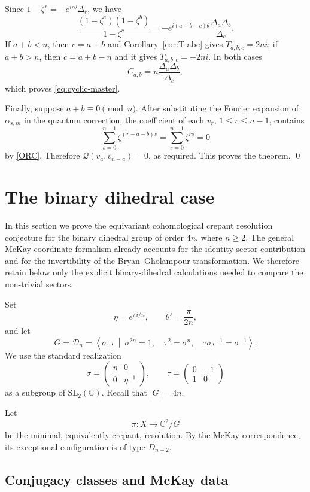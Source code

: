 \documentclass[a4paper,reqno]{amsart}
\theoremstyle{plain} %
\theoremstyle{definition} %
\theoremstyle{remark} %
\newcommand{\z}{\zeta}
\newcommand{\cD}{{\mathcal D}}
\newcommand{\1}{\mathds{1}}   %
\begin{document}
Since $1-\z^r=-e^{ir\theta}\Delta_r$, we have
\[
\frac{(1-\z^a)(1-\z^b)}{1-\z^c}
=-e^{i(a+b-c)\theta}\frac{\Delta_a\Delta_b}{\Delta_c}.
\]
If $a+b<n$, then $c=a+b$ and Corollary~\ref{cor:T-abc} gives
$T_{a,b,c}=2ni$; if $a+b>n$, then $c=a+b-n$ and it gives
$T_{a,b,c}=-2ni$.  In both cases
\[
C_{a,b}=n\frac{\Delta_a\Delta_b}{\Delta_c},
\]
which proves \eqref{eq:cyclic-master}.

Finally, suppose $a+b\equiv0\pmod n$.  After substituting the Fourier
expansion of $\alpha_{s,m}$ in the quantum correction, the coefficient of
each $v_r$, $1\leq r\leq n-1$, contains
\[
\sum_{s=0}^{n-1}\z^{(r-a-b)s}
=
\sum_{s=0}^{n-1}\z^{rs}=0
\]
by \eqref{ORC}.  Therefore $\mathcal Q(v_a,v_{n-a})=0$, as required. This proves the theorem.
\qed


\section{The binary dihedral case}\label{sec:binary-dihedral}

In this section we prove the equivariant cohomological crepant
resolution conjecture for the binary dihedral group of order \(4n\),
where \(n\ge2\). The general McKay-coordinate formalism already
accounts for the identity-sector contribution and for the invertibility of the
Bryan--Gholampour transformation.  We therefore retain below only the explicit
binary-dihedral calculations needed to compare the non-trivial sectors.

Set
\[
\eta=e^{\pi i/n},
\qquad
\theta'=\frac{\pi}{2n},
\]
and let
\[
G=\cD_n
=
\left\langle
\sigma,\tau
\ \middle|\
\sigma^{2n}=1,\quad
\tau^2=\sigma^n,\quad
\tau\sigma\tau^{-1}=\sigma^{-1}
\right\rangle .
\]
We use the standard realization
\[
\sigma=
\begin{pmatrix}
\eta&0\\
0&\eta^{-1}
\end{pmatrix},
\qquad
\tau=
\begin{pmatrix}
0&-1\\
1&0
\end{pmatrix}
\]
as a subgroup of \(\mathrm{SL}_2(\mathbb C)\). Recall that $|G|=4n$. 

Let
\[
\pi \colon X\longrightarrow\mathbb C^2/G
\]
be the minimal, equivalently crepant, resolution. By the McKay
correspondence, its exceptional configuration is of type
\(D_{n+2}\).

\subsection{Conjugacy classes and McKay data}\label{conjugacy_classes_Dn}
\end{document}
